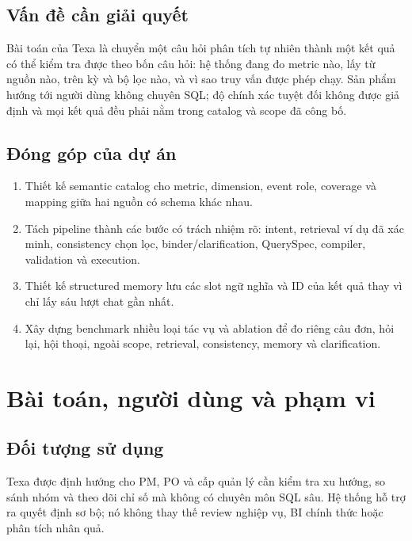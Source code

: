 \documentclass[11pt,a4paper]{article}
\begin{document}
\subsection{Vấn đề cần giải quyết}
Bài toán của Texa là chuyển một câu hỏi phân tích tự nhiên thành một kết quả có thể kiểm tra được theo bốn câu hỏi: hệ thống đang đo metric nào, lấy từ nguồn nào, trên kỳ và bộ lọc nào, và vì sao truy vấn được phép chạy. Sản phẩm hướng tới người dùng không chuyên SQL; độ chính xác tuyệt đối không được giả định và mọi kết quả đều phải nằm trong catalog và scope đã công bố.

\subsection{Đóng góp của dự án}
\begin{enumerate}
\item Thiết kế semantic catalog cho metric, dimension, event role, coverage và mapping giữa hai nguồn có schema khác nhau.
\item Tách pipeline thành các bước có trách nhiệm rõ: intent, retrieval ví dụ đã xác minh, consistency chọn lọc, binder/clarification, QuerySpec, compiler, validation và execution.
\item Thiết kế structured memory lưu các slot ngữ nghĩa và ID của kết quả thay vì chỉ lấy sáu lượt chat gần nhất.
\item Xây dựng benchmark nhiều loại tác vụ và ablation để đo riêng câu đơn, hỏi lại, hội thoại, ngoài scope, retrieval, consistency, memory và clarification.
\end{enumerate}

\section{Bài toán, người dùng và phạm vi}
\subsection{Đối tượng sử dụng}
Texa được định hướng cho PM, PO và cấp quản lý cần kiểm tra xu hướng, so sánh nhóm và theo dõi chỉ số mà không có chuyên môn SQL sâu. Hệ thống hỗ trợ ra quyết định sơ bộ; nó không thay thế review nghiệp vụ, BI chính thức hoặc phân tích nhân quả.
\end{document}
